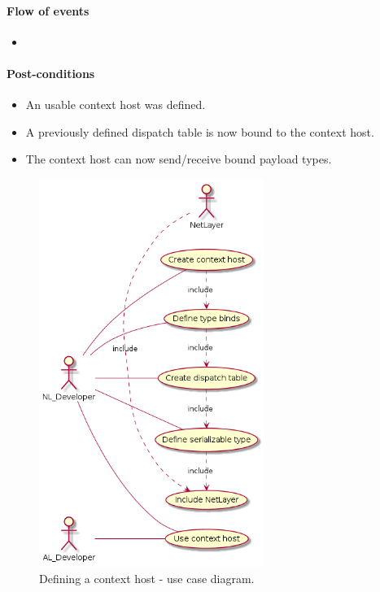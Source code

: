 \documentclass[12pt]{report}
\begin{document}
                    \paragraph{Flow of events}
                        \begin{itemize}
                            \item
                        \end{itemize}

                    \paragraph{Post-conditions}
                        \begin{itemize}
                            \item An usable context host was defined.
                            \item A previously defined dispatch table is now bound to the context host.
                            \item The context host can now send/receive bound payload types.
                        \end{itemize}

                    \begin{figure}[H]
                    \caption{Defining a context host - use case diagram.}
                    \centering
                    \includegraphics[width=0.65\textwidth]{d/uc/def_context_host.png}
                    \end{figure}
\end{document}
